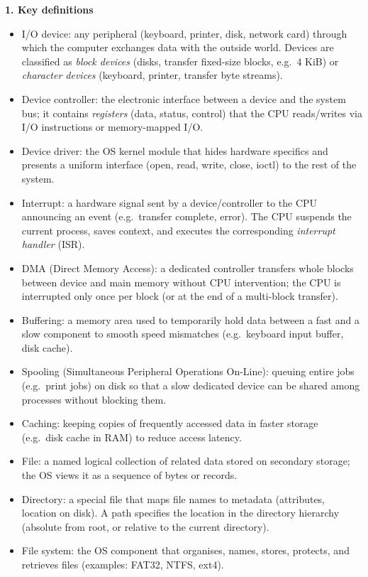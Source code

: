 \documentclass[11pt]{article}
\newcommand{\cle}[1]{{\popxbold\color{popdark}#1}}
\begin{document}
\begin{bilan}
\textbf{1. Key definitions}
\begin{itemize}
\item \cle{I/O device}: any peripheral (keyboard, printer, disk, network card) through which the computer exchanges data with the outside world. Devices are classified as \emph{block devices} (disks, transfer fixed-size blocks, e.g.\ 4 KiB) or \emph{character devices} (keyboard, printer, transfer byte streams).
\item \cle{Device controller}: the electronic interface between a device and the system bus; it contains \emph{registers} (data, status, control) that the CPU reads/writes via I/O instructions or memory-mapped I/O.
\item \cle{Device driver}: the OS kernel module that hides hardware specifics and presents a uniform interface (open, read, write, close, ioctl) to the rest of the system.
\item \cle{Interrupt}: a hardware signal sent by a device/controller to the CPU announcing an event (e.g.\ transfer complete, error). The CPU suspends the current process, saves context, and executes the corresponding \emph{interrupt handler} (ISR).
\item \cle{DMA} (Direct Memory Access): a dedicated controller transfers whole blocks between device and main memory without CPU intervention; the CPU is interrupted only once per block (or at the end of a multi-block transfer).
\item \cle{Buffering}: a memory area used to temporarily hold data between a fast and a slow component to smooth speed mismatches (e.g.\ keyboard input buffer, disk cache).
\item \cle{Spooling} (Simultaneous Peripheral Operations On-Line): queuing entire jobs (e.g.\ print jobs) on disk so that a slow dedicated device can be shared among processes without blocking them.
\item \cle{Caching}: keeping copies of frequently accessed data in faster storage (e.g.\ disk cache in RAM) to reduce access latency.
\item \cle{File}: a named logical collection of related data stored on secondary storage; the OS views it as a sequence of bytes or records.
\item \cle{Directory}: a special file that maps file names to metadata (attributes, location on disk). A \cle{path} specifies the location in the directory hierarchy (absolute from root, or relative to the current directory).
\item \cle{File system}: the OS component that organises, names, stores, protects, and retrieves files (examples: FAT32, NTFS, ext4).
\end{itemize}


\end{bilan}
\end{document}
